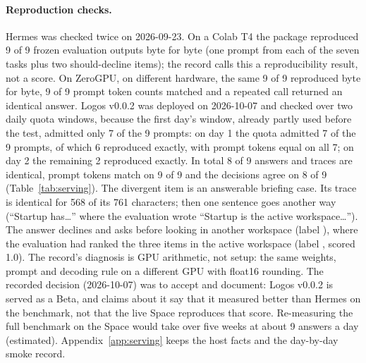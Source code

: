 \paragraph{Reproduction checks.}
Hermes was checked twice on 2026-09-23. On a Colab T4 the package reproduced 9 of 9 frozen evaluation outputs byte for byte (one prompt from each of the seven tasks plus two should-decline items); the record calls this a reproducibility result, not a score. On ZeroGPU, on different hardware, the same 9 of 9 reproduced byte for byte, 9 of 9 prompt token counts matched and a repeated call returned an identical answer. Logos v0.0.2 was deployed on 2026-10-07 and checked over two daily quota windows, because the first day's window, already partly used before the test, admitted only 7 of the 9 prompts: on day 1 the quota admitted 7 of the 9 prompts, of which 6 reproduced exactly, with prompt tokens equal on all 7; on day 2 the remaining 2 reproduced exactly. In total 8 of 9 answers and traces are identical, prompt tokens match on 9 of 9 and the decisions agree on 8 of 9 (Table~\ref{tab:serving}). The divergent item is an answerable briefing case. Its trace is identical for 568 of its 761 characters; then one sentence goes another way (``Startup has\ldots'' where the evaluation wrote ``Startup is the active workspace\ldots''). The answer declines and asks before looking in another workspace (label ), where the evaluation had ranked the three items in the active workspace (label , scored 1.0). The record's diagnosis is GPU arithmetic, not setup: the same weights, prompt and decoding rule on a different GPU with float16 rounding. The recorded decision (2026-10-07) was to accept and document: Logos v0.0.2 is served as a Beta, and claims about it say that it measured better than Hermes on the benchmark, not that the live Space reproduces that score. Re-measuring the full benchmark on the Space would take over five weeks at about 9 answers a day (estimated). Appendix~\ref{app:serving} keeps the host facts and the day-by-day smoke record.

